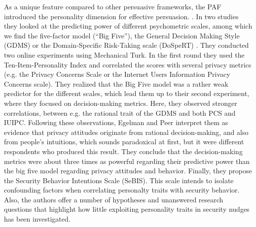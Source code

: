 	
	
	As a unique feature compared to other persuasive frameworks, the \gls{PAF} introduced the personality dimension for effective persuasion. . In two studies they looked at the predicting power of different psychometric scales, among which we find the five-factor model (``Big Five''), the General Decision Making Style (GDMS) or the Domain-Specific Risk-Taking scale (DoSpeRT) . They conducted two online experiments using Mechanical Turk. In the first round they used the Ten-Item-Personality Index and correlated the scores with several privacy metrics (e.g. the Privacy Concerns Scale or the Internet Users Information Privacy Concerns scale). They realized that the Big Five model was a rather weak predictor for the different scales, which lead them up to their second experiment, where they focused on decision-making metrics. Here, they observed stronger correlations, between e.g. the rational trait of the GDMS and both PCS and IUIPC. Following these observations, Egelman and Peer interpret them as evidence that privacy attitudes originate from rational decision-making, and also from people's intuitions, which sounds paradoxical at first, but it were different respondents who produced this result. They conclude that the decision-making metrics were about three times as powerful regarding their predictive power than the big five model regarding privacy attitudes and behavior. Finally, they propose the Security Behavior Intentions Scale (SeBIS). This scale intends to isolate confounding factors when correlating personalty traits with security behavior. Also, the authors offer a number of hypotheses and unanswered research questions that highlight how little exploiting personality traits in security nudges has been investigated. 
	

